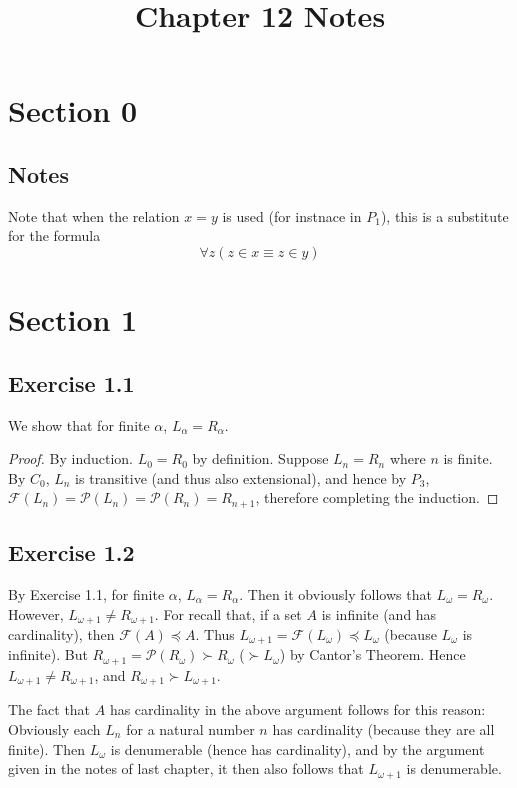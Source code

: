 \documentclass{article}
\title{Chapter 12 Notes}
\theoremstyle{definition}
\begin{document}
\date{}
\maketitle

\section*{Section 0}

\subsection*{Notes}
Note that when the relation $x=y$ is used (for instnace in $P_1$), this is a substitute for the formula
\[ \forall z(z\in x\equiv z\in y) \]

\section*{Section 1}

\subsection*{Exercise 1.1}
We show that for finite $\alpha$, $L_\alpha=R_\alpha$.
\begin{proof}
By induction. $L_0=R_0$ by definition. Suppose $L_n=R_n$ where $n$ is finite. By $C_0$, $L_n$ is transitive
(and thus also extensional), and hence by $P_3$, $\mathcal{F}(L_n)=\mathcal{P}(L_n)=\mathcal{P}(R_n)=R_{n+1}$, 
therefore completing the induction.
\end{proof}

\subsection*{Exercise 1.2}
By Exercise 1.1, for finite $\alpha$, $L_\alpha=R_\alpha$. Then it obviously follows that 
$L_\omega=R_\omega$. However, $L_{\omega+1}\ne R_{\omega+1}$. For recall that, if 
a set $A$ is infinite (and has cardinality), then $\mathcal{F}(A)\preceq A$. 
Thus $L_{\omega+1}=\mathcal{F}(L_\omega)\preceq L_\omega$ (because $L_\omega$ is infinite). But
$R_{\omega+1}=\mathcal{P}(R_\omega)\succ R_\omega$ ($\succ L_\omega$) by 
Cantor's Theorem. Hence $L_{\omega+1}\ne R_{\omega+1}$, and $R_{\omega+1}\succ L_{\omega+1}$.

The fact that $A$ has cardinality in the above argument follows for this reason: Obviously each 
$L_n$ for a natural number $n$ has cardinality (because they are all finite). Then 
$L_\omega$ is denumerable (hence has cardinality), and by the argument given in the notes of last 
chapter, it then also follows that $L_{\omega+1}$ is denumerable.
\end{document}
